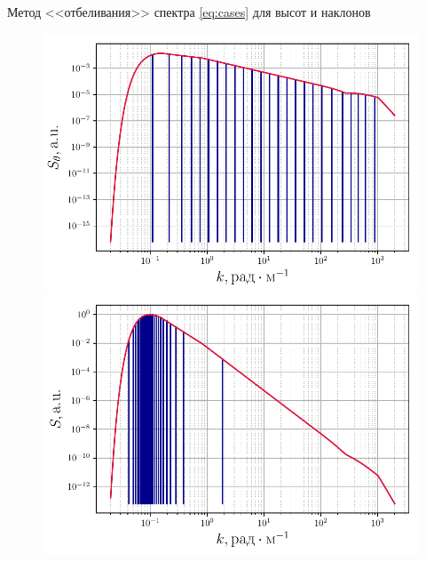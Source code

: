 \begin{frame}[t]{}
\begin{columns}[t]
\begin{column}{.48\linewidth}
\begin{block}{Метод <<отбеливания>> спектра}
                \eqref{eq:cases} для высот и наклонов
                \begin{figure}[H]
                    \begin{minipage}{0.32\linewidth}
                            \centering
                            \includegraphics[width=\linewidth]{fig/split_angles}	
                    \end{minipage}
                    \hfill
                    \begin{minipage}{0.32\linewidth}
                            \centering
                            \includegraphics[width=\linewidth]{fig/split_height}
                    \end{minipage}
                    \begin{minipage}{0.32\linewidth}
                            \centering
                    \vspace{-15pt}

\end{minipage}
\end{figure}
\end{block}
\end{column}
\end{columns}
\end{frame}
